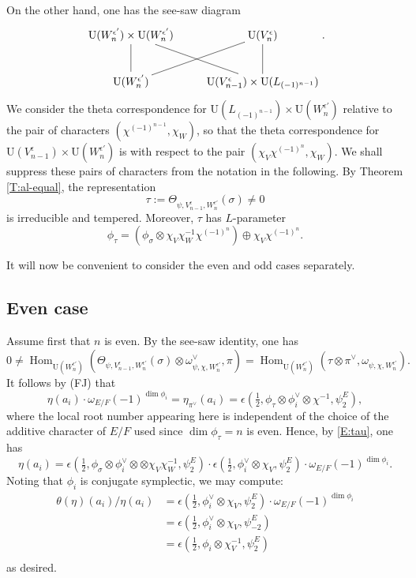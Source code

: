 \documentclass[11pt]{amsart}
\numberwithin{equation}{section}
\theoremstyle{plain}
\theoremstyle{definition}
\theoremstyle{remark}
\def\Hom{\operatorname{Hom}}
\def\U{\mathrm{U}}
\begin{document}
On the other hand, one has the see-saw diagram
\[
 \xymatrix{
  \U(W_n^{\epsilon'})  \times \U(W_n^{\epsilon'})  \ar@{-}[dr] \ar@{-}[d] & \U(V^{\epsilon}_n) \ar@{-}[d] \\
  \U(W_n^{\epsilon'}) \ar@{-}[ur] &  \U(V^{\epsilon}_{n-1}) \times \U(L_{(-1)^{n-1}})}.
\] 
We consider the theta correspondence for $\U(L_{(-1)^{n-1}}) \times \U(W_n^{\epsilon'})$ relative to the pair of characters $(\chi^{(-1)^{n-1}}, \chi_W)$, so that the theta correspondence for $\U(V^{\epsilon}_{n-1}) \times \U(W_n^{\epsilon'})$ is with respect to the pair $(\chi_V \chi^{(-1)^n}, \chi_W)$. We shall suppress these pairs of characters from the notation in the following.
By Theorem \ref{T:al-equal}, the representation
\[  \tau := \Theta_{\psi, V^{\epsilon}_{n-1}, W_n^{\epsilon'}}(\sigma) \ne 0 \]
is irreducible and tempered.
Moreover, $\tau$ has $L$-parameter
\begin{equation} \label{E:tau}
  \phi_{\tau}  =  (\phi_{\sigma} \otimes \chi_V \chi_W^{-1} \chi^{(-1)^n} )
  \oplus \chi_V \chi^{(-1)^n}. \end{equation}

It will now be convenient to consider the even and odd cases separately.

\subsection{Even case}

Assume first that $n$ is even. By the see-saw identity, one has
\[ 0 \ne \Hom_{\U(W_n^{\epsilon'})}( \Theta_{\psi, V^{\epsilon}_{n-1}, W_n^{\epsilon'}}(\sigma) \otimes \omega_{\psi , \chi,  W_n^{\epsilon'}}^{\vee}, \pi) = \Hom_{\U(W_n^{\epsilon'})} (\tau \otimes \pi^{\vee}, \omega_{\psi,\chi, W_n^{\epsilon'}}). \]
It follows by (FJ) that
\[ 
 \eta(a_i) \cdot \omega_{E/F}(-1)^{\dim \phi_i} = \eta_{\pi^{\vee}}(a_i)  =
 \epsilon(\tfrac{1}{2}, \phi_{\tau} \otimes \phi_i^{\vee} \otimes \chi^{-1}, \psi_2^E), \]
where the local root number appearing here is independent of the choice of the additive character of $E/F$ used since $\dim \phi_\tau = n$ is even. Hence, by \eqref{E:tau}, one has
\[  \eta(a_i)  = 
  \epsilon(\tfrac{1}{2}, \phi_{\sigma} \otimes \phi_i^{\vee} \otimes \otimes \chi_V \chi_W^{-1}, \psi_2^E)
  \cdot \epsilon(\tfrac{1}{2}, \phi_i^{\vee} \otimes \chi_V, \psi_2^E)
  \cdot  \omega_{E/F}(-1)^{\dim \phi_i}.  
\] 
Noting that $\phi_i$ is conjugate symplectic, we may compute:
\begin{align*}
  \theta(\eta)(a_i) / \eta(a_i) & = \epsilon(\tfrac{1}{2}, \phi_i^{\vee} \otimes \chi_V, \psi_2^E) \cdot \omega_{E/F}(-1)^{\dim \phi_i}   \\
  & =  \epsilon(\tfrac{1}{2}, \phi_i^{\vee} \otimes \chi_V, \psi_{-2}^E) \\
  & =  \epsilon(\tfrac{1}{2}, \phi_i \otimes \chi_V^{-1}, \psi_2^E) \\
\end{align*}
 as desired.
\end{document}
